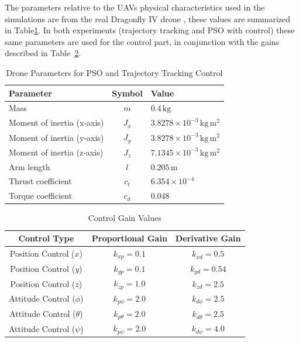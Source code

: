 The parameters relative to the UAVs physical
characteristics used in the simulations are from 
the real Dragonfly IV drone \cite{drone}, these values are
summarized in Table\ref{tab:drone_parameters}.
In both experiments (trajectory tracking and PSO with
control) these same parameters are used for the control
part, in conjunction with the gains 
described in Table~\ref{tab:control_gains}.
\begin{table}[h!]
\centering
\caption{Drone Parameters for PSO and Trajectory Tracking Control}
\begin{tabular}{|l|c|l|}
\hline
\textbf{Parameter}           & \textbf{Symbol}  & \textbf{Value} \\ \hline
Mass                        & \(m\)           & \(0.4 \, \text{kg}\) \\ \hline
Moment of inertia (x-axis)  & \(J_x\)         & \(3.8278 \times 10^{-3} \, \text{kg}\,\text{m}^2\) \\ \hline
Moment of inertia (y-axis)  & \(J_y\)         & \(3.8278 \times 10^{-3} \, \text{kg}\,\text{m}^2\) \\ \hline
Moment of inertia (z-axis)  & \(J_z\)         & \(7.1345 \times 10^{-3} \, \text{kg}\,\text{m}^2\) \\ \hline
Arm length                  & \(l\)           & \(0.205 \, \text{m}\) \\ \hline
Thrust coefficient          & \(c_t\)         & \(6.354 \times 10^{-4}\) \\ \hline
Torque coefficient          & \(c_d\)         & \(0.048\) \\ \hline
\end{tabular}
\label{tab:drone_parameters}
\end{table}
\begin{table}[h!]
\centering
\caption{Control Gain Values}
\label{tab:control_gains}
\begin{tabular}{|c|c|c|}
\hline
\textbf{Control Type} & \textbf{Proportional Gain} & \textbf{Derivative Gain} \\ \hline
Position Control (\(x\)) & \(k_{xp} = 0.1\)         & \(k_{xd} = 0.5\)         \\ \hline
Position Control (\(y\)) & \(k_{yp} = 0.1\)         & \(k_{yd} = 0.54\)        \\ \hline
Position Control (\(z\)) & \(k_{zp} = 1.0\)         & \(k_{zd} = 2.5\)         \\ \hline
Attitude Control (\(\phi\)) & \(k_{p\phi} = 2.0\)     & \(k_{d\phi} = 2.5\)      \\ \hline
Attitude Control (\(\theta\)) & \(k_{p\theta} = 2.0\)  & \(k_{d\theta} = 2.5\)    \\ \hline
Attitude Control (\(\psi\)) & \(k_{p\psi} = 2.0\)     & \(k_{d\psi} = 4.0\)      \\ \hline
\end{tabular}
\end{table}
